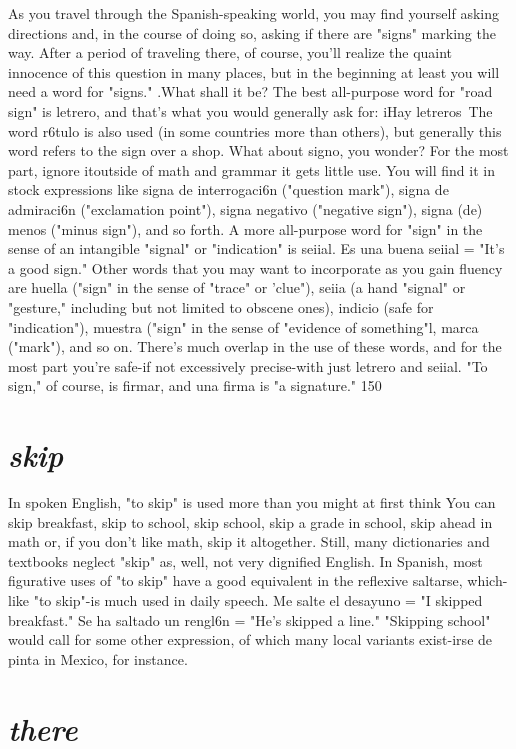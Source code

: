 As you travel through the Spanish-speaking world, you may
find yourself asking directions and, in the course of doing so, asking if
there are "signs" marking the way. After a period of traveling there, of
course, you'll realize the quaint innocence of this question in many
places, but in the beginning at least you will need a word for "signs."
.What shall it be? The best all-purpose word for "road sign" is letrero,
and that's what you would generally ask for: iHay letreros~The word
r6tulo is also used (in some countries more than others), but generally
this word refers to the sign over a shop.
What about signo, you wonder? For the most part, ignore itoutside of math and grammar it gets little use. You will find it in stock
expressions like signa de interrogaci6n ("question mark"), signa de
admiraci6n ("exclamation point"), signa negativo ("negative sign"),
signa (de) menos ("minus sign"), and so forth. A more all-purpose word
for "sign" in the sense of an intangible "signal" or "indication" is seiial.
Es una buena seiial = "It's a good sign."
Other words that you may want to incorporate as you gain fluency are huella ("sign" in the sense of "trace" or 'clue"), seiia (a hand
"signal" or "gesture," including but not limited to obscene ones), indicio (safe for "indication"), muestra ("sign" in the sense of "evidence
of something"l, marca ("mark"), and so on. There's much overlap in
the use of these words, and for the most part you're safe-if not excessively precise-with just letrero and seiial. "To sign," of course, is firmar, and una firma is "a signature."
150

\section{\emph{skip}}

In spoken English, "to skip" is used more than you might at
first think You can skip breakfast, skip to school, skip school, skip a
grade in school, skip ahead in math or, if you don't like math, skip it
altogether. Still, many dictionaries and textbooks neglect "skip" as,
well, not very dignified English. In Spanish, most figurative uses of
"to skip" have a good equivalent in the reflexive saltarse, which-like
"to skip"-is much used in daily speech. Me salte el desayuno = "I
skipped breakfast." Se ha saltado un rengl6n = "He's skipped a line."
"Skipping school" would call for some other expression, of which
many local variants exist-irse de pinta in Mexico, for instance.

\section{\emph{there}}

